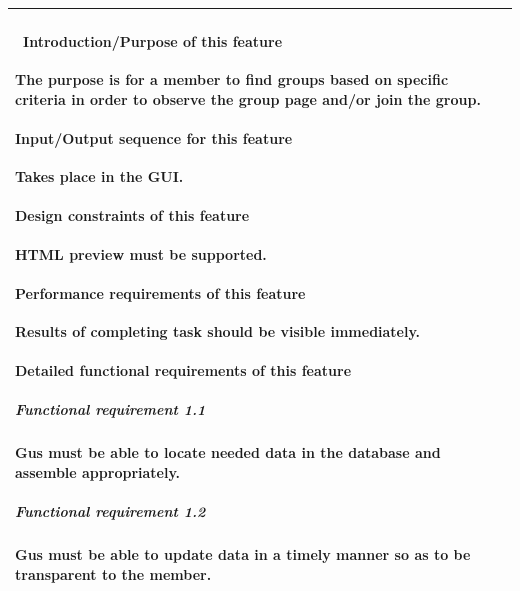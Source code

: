 \documentclass[letterpaper]{article}
\begin{document}
\begin{flushleft}
\begin{supertabular}{|m{3.17056in}|m{3.1712599in}|}
\paragraph[\ Introduction/Purpose of this
feature]{\rmfamily \ Introduction/Purpose of
this feature}
{\color{black} The purpose is for a member to find groups based on
specific criteria in order to observe the group page and/or join the
group.}

\paragraph[Input/Output sequence for this
feature]{\rmfamily Input/Output sequence for
this feature}
{\color{black} Takes place in the GUI.}

\paragraph[Design constraints of this
feature]{\rmfamily Design constraints of this
feature}
{\color{black} HTML preview must be supported.}

\paragraph[Performance requirements of this
feature]{\rmfamily Performance requirements of
this feature}
{\color{black} Results of completing task should be visible
immediately.}

\paragraph[Detailed functional requirements of this
feature]{\rmfamily Detailed functional
requirements of this feature}
\subparagraph[Functional requirement 1.1]{
Functional requirement 1.1}
{\color{black} Gus must be able to locate needed data in the database
and assemble appropriately.}

\subparagraph[Functional requirement 1.2]{
Functional requirement 1.2}
{\color{black} Gus must be able to update data in a timely manner so as
to be transparent to the member.}

~
\\\hline
\end{supertabular}
\end{flushleft}
\end{document}
